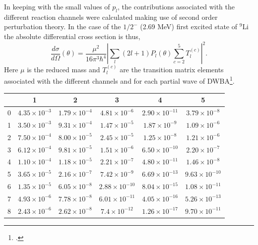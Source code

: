  
 In keeping with the small values of $p_l$,  the  contributions associated with the different reaction channels were calculated making use of second order perturbation theory. In the case of the $1/2^-$ (2.69 MeV) first excited state of $^9$Li the absolute differential cross section is thus,
 \begin{equation}
 \frac{d\sigma}{d\Omega}(\theta)=\frac{\mu^2}{16\pi^3\hbar^4}\left|\sum_l(2l+1)P_l(\theta)\sum_{c=2}^5 T^{(c)}_l\right|^2.
 \end{equation}
 Here $\mu$ is the reduced mass and $T^{(c)}_l$ are the transition matrix elements associated with the different channels and for each partial wave of DWBA\footnote{\cite{Satchler:80}.}.
 
 \begin{table}
 	\begin{center}
 		\begin{tabular}{|c|c|c|c|c|c|}
 			\hline
 			\backslashbox {$l$}{$c$} & \textbf{1} & \textbf{2} & \textbf{3} & \textbf{4}& \textbf{5} \\
 			\hline
 			0& $4.35\times 10^{-3}$ &$1.79\times 10^{-4}$ & $4.81\times 10^{-6}$& $2.90\times 10^{-11}$& $3.79\times 10^{-8}$\\
 			\hline
 			1& $3.50\times 10^{-3}$& $9.31\times 10^{-4}$& $1.47\times 10^{-5}$&$1.87\times 10^{-9}$& $1.09\times 10^{-6}$\\
 			\hline
 			2& $7.50 \times 10^{-4}$& $8.00\times 10^{-5}$& $2.45\times 10^{-5}$&$1.25\times 10^{-8}$&$1.21\times 10^{-6}$\\
 			\hline
 			3& $6.12\times 10^{-4}$&$9.81\times 10^{-5}$ & $1.51\times 10^{-6}$&$6.50\times 10^{-10}$&$2.20\times 10^{-7}$\\
 			\hline
 			4&$1.10\times 10^{-4}$ &$ 1.18\times 10^{-5}$ & $2.21\times 10^{-7}$&$4.80\times 10^{-11}$&$1.46\times 10^{-8}$ \\
 			\hline
 			5& $3.65\times 10^{-5}$& $2.16\times 10^{-7}$& $7.42\times 10^{-9}$&$6.69\times 10^{-13}$&$9.63\times 10^{-10}$\\
 			\hline
 			6& $1.35\times 10^{-5}$& $6.05\times 10^{-8}$&$2.88\times 10^{-10}$ &$8.04\times 10^{-15}$&$1.08\times 10^{-11}$\\
 			\hline
 			7& $4.93\times 10^{-6}$& $7.78\times 10^{-8}$& $6.01\times 10^{-11}$&$4.05\times 10^{-16}$&$5.26\times 10^{-13}$\\
 			\hline
 			8& $2.43\times 10^{-6}$& $2.62\times 10^{-8}$& $7.4\times 10^{-12}$&$1.26\times 10^{-17}$&$9.70\times 10^{-11}$\\

\end{tabular}
\end{center}
\end{table}
